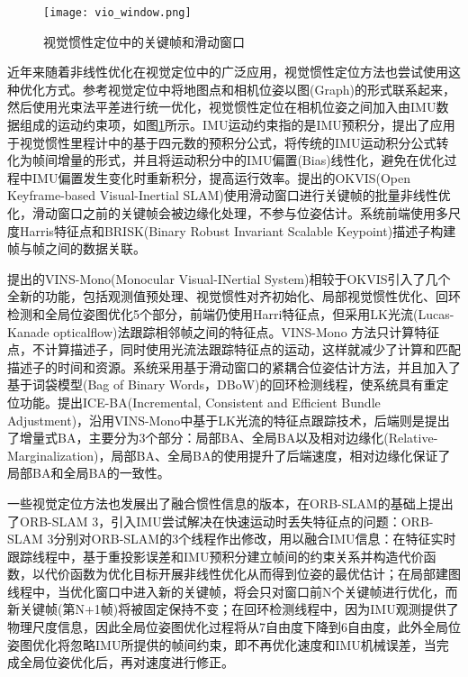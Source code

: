 \begin{figure}
  \centering
  \texttt{[image: vio\_window.png]}
  \caption{视觉惯性定位中的关键帧和滑动窗口}
  \label{fig:vio_window}
\end{figure}

近年来随着非线性优化在视觉定位中的广泛应用，视觉惯性定位方法也尝试使用这种优化方式。参考视觉定位中将地图点和相机位姿以图(Graph)的形式联系起来，然后使用光束法平差进行统一优化，视觉惯性定位在相机位姿之间加入由IMU数据组成的运动约束项，如图\ref{fig:vio_window}所示。IMU运动约束指的是IMU预积分，\citet{forster2016manifold}提出了应用于视觉惯性里程计中的基于四元数的预积分公式，将传统的IMU运动积分公式转化为帧间增量的形式，并且将运动积分中的IMU偏置(Bias)线性化，避免在优化过程中IMU偏置发生变化时重新积分，提高运行效率。\citet{leutenegger2015keyframe}提出的OKVIS(Open Keyframe-based Visual-Inertial SLAM)使用滑动窗口进行关键帧的批量非线性优化，滑动窗口之前的关键帧会被边缘化处理，不参与位姿估计。系统前端使用多尺度Harris\cite{harris1988combined}特征点和BRISK(Binary Robust Invariant Scalable Keypoint)\cite{leutenegger2011brisk}描述子构建帧与帧之间的数据关联。

\citet{qin2018vins}提出的VINS-Mono(Monocular Visual-INertial System)相较于OKVIS引入了几个全新的功能，包括观测值预处理、视觉惯性对齐初始化、局部视觉惯性优化、回环检测和全局位姿图优化5个部分，前端仍使用Harri特征点，但采用LK光流(Lucas-Kanade opticalflow)\cite{lucas1981iterative}法跟踪相邻帧之间的特征点。VINS-Mono 方法只计算特征点，不计算描述子，同时使用光流法跟踪特征点的运动，这样就减少了计算和匹配描述子的时间和资源。系统采用基于滑动窗口的紧耦合位姿估计方法，并且加入了基于词袋模型(Bag of Binary Words，DBoW)\cite{galvez2012bags}的回环检测线程，使系统具有重定位功能。\citet{liu2018ice}提出ICE-BA(Incremental, Consistent and Efficient Bundle Adjustment)，沿用VINS-Mono中基于LK光流的特征点跟踪技术，后端则是提出了增量式BA，主要分为3个部分：局部BA、全局BA以及相对边缘化(Relative-Marginalization)，局部BA、全局BA的使用提升了后端速度，相对边缘化保证了局部BA和全局BA的一致性。

一些视觉定位方法也发展出了融合惯性信息的版本，\citet{campos2021orb}在ORB-SLAM的基础上提出了ORB-SLAM 3，引入IMU尝试解决在快速运动时丢失特征点的问题：ORB-SLAM 3分别对ORB-SLAM的3个线程作出修改，用以融合IMU信息：在特征实时跟踪线程中，基于重投影误差和IMU预积分建立帧间的约束关系并构造代价函数，以代价函数为优化目标开展非线性优化从而得到位姿的最优估计；在局部建图线程中，当优化窗口中进入新的关键帧，将会只对窗口前N个关键帧进行优化，而新关键帧(第N+1帧)将被固定保持不变；在回环检测线程中，因为IMU观测提供了物理尺度信息，因此全局位姿图优化过程将从7自由度下降到6自由度，此外全局位姿图优化将忽略IMU所提供的帧间约束，即不再优化速度和IMU机械误差，当完成全局位姿优化后，再对速度进行修正。

